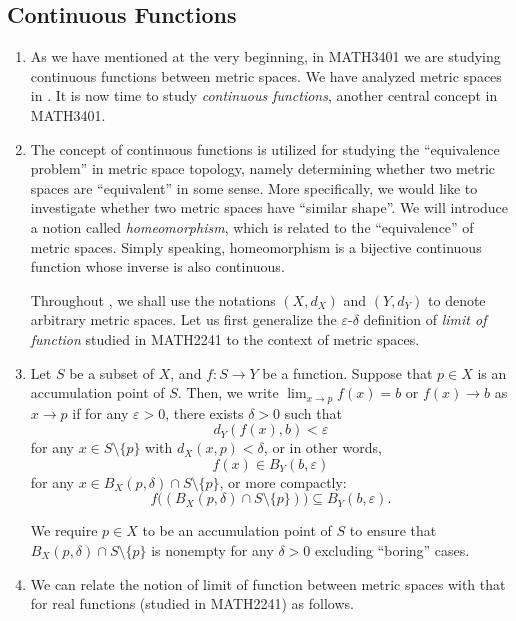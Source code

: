 \subsection{Continuous Functions}
\label{subsect:cts-fun}
\begin{enumerate}
\item As we have mentioned at the very beginning, in MATH3401 we are studying
continuous functions between metric spaces. We have analyzed metric spaces in
. It is now time to study \emph{continuous functions},
another central concept in MATH3401.

\item The concept of continuous functions is utilized for studying the
``equivalence problem'' in metric space topology, namely determining whether
two metric spaces are ``equivalent'' in some sense. More specifically, we would
like to investigate whether two metric spaces have ``similar shape''. We will
introduce a notion called \emph{homeomorphism}, which is related to the
``equivalence'' of metric spaces. Simply speaking, homeomorphism is a bijective
continuous function whose inverse is also continuous.

Throughout , we shall use the notations \((X,d_{X})\) and
\((Y,d_Y)\) to denote arbitrary metric spaces. Let us first generalize the
\(\varepsilon\)-\(\delta\) definition of \emph{limit of function} studied in
MATH2241 to the context of metric spaces.

\item Let \(S\) be a subset of \(X\), and \(f:S\to Y\) be a function. Suppose
that \(p\in X\) is an accumulation point of \(S\). Then, we write
\(\displaystyle \lim_{x\to p}f(x)=b\) or \(f(x)\to b\) as \(x\to p\) if for any
\(\varepsilon>0\), there exists \(\delta>0\) such that
\[
d_Y(f(x),b)<\varepsilon
\]
for any \(x\in S\setminus\{p\}\) with \(d_X(x,p)<\delta\), or in other words,
\[
f(x)\in B_Y(b,\varepsilon)
\]
for any \(x\in B_X(p,\delta)\cap S\setminus \{p\}\), or more compactly:
\[
f\big((B_X(p,\delta)\cap S\setminus \{p\})\big)\subseteq B_Y(b,\varepsilon).
\]
\begin{note}
We require \(p\in X\) to be an accumulation point of \(S\) to ensure that
\(B_X(p,\delta)\cap S\setminus \{p\}\) is nonempty for any \(\delta>0\)
 excluding ``boring'' cases.
\end{note}

\item \label{it:ms-lim-fun-relate-real-lim-fun} We can relate the notion of
limit of function between metric spaces with that for real functions
(studied in MATH2241) as follows.


\end{enumerate}
